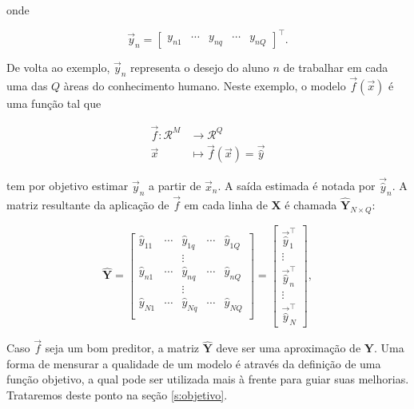     onde

    \begin{equation} \label{e:y_n}
      \vec{y}_n = \begin{bmatrix} y_{n1} & \cdots & y_{nq} & \cdots & y_{nQ} \end{bmatrix}^{\top}
      .
    \end{equation}

    De volta ao exemplo, $\vec{y}_n$ representa o desejo do aluno $n$ de trabalhar em cada uma das $Q$ àreas do conhecimento humano. Neste exemplo, o modelo $\vec{f}(\vec{x})$ é uma função tal que

    \begin{align*}
      \vec{f} \colon \mathcal{R}^M & \longrightarrow \mathcal{R}^Q \\
      \vec{x} & \longmapsto \vec{f}({\vec{x}}) = \vec{\hat{y}}
    \end{align*}

    \noindent tem por objetivo estimar $\vec{y}_n$ a partir de $\vec{x}_n$. A saída estimada é notada por $\vec{\hat{y}}_n$. A matriz resultante da aplicação de $\vec{f}$ em cada linha de $\boldsymbol{X}$ é chamada $\boldsymbol{\hat{Y}}_{N \times Q}$:

    \begin{equation} \label{e:Y_hat}
      \boldsymbol{\hat{Y}} = \begin{bmatrix}
            \hat{y}_{11} & \cdots & \hat{y}_{1q} & \cdots & \hat{y}_{1Q} \\
                   & & \vdots & &       \\
            \hat{y}_{n1} & \cdots & \hat{y}_{nq} & \cdots & \hat{y}_{nQ} \\
                   & & \vdots & &       \\
            \hat{y}_{N1} & \cdots & \hat{y}_{Nq} & \cdots & \hat{y}_{NQ} \\
          \end{bmatrix}
        = \begin{bmatrix}
            \vec{\hat{y}}_1^{\top} \\
            \vdots \\
            \vec{\hat{y}}_n^{\top} \\
            \vdots \\
            \vec{\hat{y}}_N^{\top}
          \end{bmatrix}
          ,
    \end{equation}

    Caso $\vec{f}$ seja um bom preditor, a matriz $\boldsymbol{\hat{Y}}$ deve ser uma aproximação de $\boldsymbol{Y}$. Uma forma de mensurar a qualidade de um modelo é através da definição de uma função objetivo, a qual pode ser utilizada mais à frente para guiar suas melhorias. Trataremos deste ponto na seção \ref{s:objetivo}.

